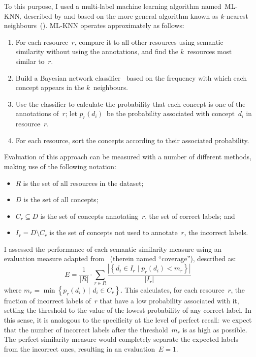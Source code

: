 To this purpose, I used a multi-label machine learning algorithm named~ML-KNN, described by \citet{Zhang2007} and based on the more general algorithm known as $k$-nearest neighbours~(\knn). ML-KNN operates approximately as follows:
\begin{enumerate}
    \item For each resource~$r$, compare it to all other resources using semantic similarity without using the  annotations, and find the $k$~resources most similar to~$r$.
    \item Build a Bayesian network classifier~\citep{Friedman1997} based on the frequency with which each  concept appears in the $k$~neighbours.
    \item Use the classifier to calculate the probability that each  concept is one of the annotations of~$r$; let $p_r(d_i)$~be the probability associated with concept~$d_i$ in resource~$r$.
    \item For each resource, sort the  concepts according to their associated probability.
\end{enumerate}

Evaluation of this approach can be measured with a number of different methods, making use of the following notation:
\begin{itemize}
    \item $R$ is the set of all resources in the dataset;
    \item $D$ is the set of all  concepts;
    \item $C_r \subseteq D$ is the set of  concepts annotating~$r$, \ie the set of correct labels; and
    \item $I_r = D \setminus C_r$ is the set of concepts not used to annotate~$r$, \ie the incorrect labels.
\end{itemize}
I assessed the performance of each semantic similarity measure using an evaluation measure adapted from~\citet{Zhang2007} (therein named ``coverage''), described as:
\begin{equation}
    E = \frac{1}{\left\vert R\right\vert} \cdot
    \sum_{r\in R} \frac
        {\left\vert\left\{d_i\in I_r\mid p_r(d_i) < m_r\right\}\right\vert}
        {\left\vert I_r\right\vert}
\end{equation}
where $m_r=\min\left\{p_r(d_i)\mid d_i\in C_r\right\}$. This calculates, for each resource~$r$, the fraction of incorrect labels of~$r$ that have a low probability associated with it, setting the threshold to the value of the lowest probability of any correct label. In this sense, it is analogous to the specificity at the level of perfect recall: we expect that the number of incorrect labels after the threshold~$m_r$ is as high as possible. The perfect similarity measure would completely separate the expected  labels from the incorrect ones, resulting in an evaluation~$E=1$.

